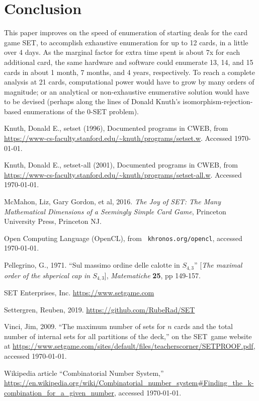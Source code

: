 \documentclass[10pt]{amsart}
\newcommand{\SETb}{SET\texttrademark\ } %
\newcommand{\SET}{SET\texttrademark}  %
\begin{document}
\section{Conclusion}
This paper improves on the speed of enumeration of starting deals for the card
game \SET, to accomplish exhaustive enumeration for up to 12 cards, in a little
over 4 days. As the marginal factor for extra time spent is about 7x for each
additional card, the same hardware and software could enumerate 13, 14, and 15
cards in about 1 month, 7 months, and 4 years, respectively. To reach a complete
analysis at 21 cards, computational power would have to grow by many orders of
magnitude; or an analytical or non-exhaustive enumerative solution would have to
be devised (perhaps along the lines of Donald Knuth's
isomorphism-rejection-based enumerations of the 0-SET problem).



\begin{thebibliography}{9} %


Knuth, Donald E., {\sc setset} (1996), Documented programs in
  CWEB, from
  \url{https://www-cs-faculty.stanford.edu/~knuth/programs/setset.w}. Accessed
  \today.

Knuth, Donald E., {\sc setset-all} (2001), Documented
  programs in CWEB, from
  \url{https://www-cs-faculty.stanford.edu/~knuth/programs/setset-all.w}. Accessed
  \today.

 McMahon, Liz, Gary Gordon, et al, 2016. {\em The Joy of SET: The
  Many Mathematical Dimensions of a Seemingly Simple Card Game}, Princeton
  University Press, Princeton NJ.

 Open Computing Language (OpenCL), from {\tt
  khronos.org/opencl}, accessed \today.

Pellegrino, G., 1971. ``Sul massimo ordine delle calotte in
  $S_{4,3}$'' [{\em The maximal order of the shperical cap in $S_{4,3}$}], {\em
  Matematiche} {\bf 25}, pp 149-157.

 SET Enterprises, Inc. \url{https://www.setgame.com}

Settergren, Reuben, 2019. \url{https://github.com/RubeRad/SET}
  
Vinci, Jim, 2009. ``The maximum number of sets for $n$ cards and
  the total number of internal sets for all partitions of the deck,'' on the
  \SETb game website at
  \url{https://www.setgame.com/sites/default/files/teacherscorner/SETPROOF.pdf},
  accessed \today.

 Wikipedia article ``Combinatorial Number System,'' \url{https://en.wikipedia.org/wiki/Combinatorial_number_system#Finding_the_k-combination_for_a_given_number},
  accessed \today.

\end{thebibliography}
 
\end{document}
